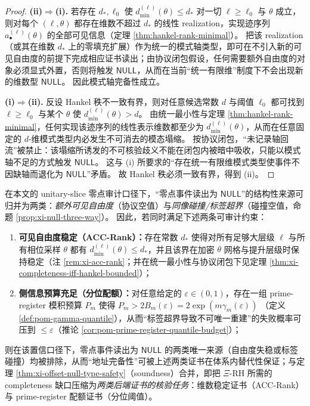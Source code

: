 \begin{proof}
\textbf{(ii)\(\Rightarrow\)(i).}
若存在 \(d_\ast,\ell_0\) 使 \(d^{(\ell)}_{\min}(\theta)\le d_\ast\) 对一切 \(\ell\ge\ell_0\) 与 \(\theta\) 成立，则对每个 \((\ell,\theta)\) 都存在维数不超过 \(d_\ast\) 的线性 realization，实现迹序列 \(a^{(\ell)}_\bullet(\theta)\) 的全部可见信息（定理 \ref{thm:hankel-rank-minimal}）。
把该 realization（或其在维数 \(d_\ast\) 上的零填充扩展）作为统一的模式轴类型，即可在不引入新的可见自由度的前提下完成相应证书读出；由协议闭包假设，任何需要额外自由度的对象必须显式外置，否则将触发 \(\mathsf{NULL}\)，从而在当前“统一有限维”制度下不会出现新的维数型 \(\mathsf{NULL}\)。
因此模式轴完备性成立。
\par
\textbf{(i)\(\Rightarrow\)(ii).}
反设 Hankel 秩不一致有界，则对任意候选常数 \(d\) 与阈值 \(\ell_0\) 都可找到 \(\ell\ge\ell_0\) 与某个 \(\theta\) 使
\(
d^{(\ell)}_{\min}(\theta)>\!d
\)。
由统一最小性与定理 \ref{thm:hankel-rank-minimal}，任何实现该迹序列的线性表示维数都至少为 \(d^{(\ell)}_{\min}(\theta)\)，从而在任意固定的 \(d\)-维模式类型内必发生不可消去的模态塌缩。
按协议闭包，“未记录轴回流”被禁止：该塌缩所诱发的不可核验歧义不能在闭包内被暗中吸收，只能以模式轴不足的方式触发 \(\mathsf{NULL}\)。
这与 (i) 所要求的“存在统一有限维模式类型使事件不因缺轴而退化为 \(\mathsf{NULL}\)”矛盾。
故 Hankel 秩必须一致有界，得到 (ii)。
\end{proof}

\begin{proposition}\label{prop:xi-completeness-auditable-decomposition}
在本文的 unitary-slice 零点审计口径下，“零点事件读出为 \(\mathsf{NULL}\)”的结构性来源可归并为两类：\emph{额外可见自由度}（协议空值）与\emph{同像碰撞/标签超界}（碰撞空值，命题 \ref{prop:xi-null-three-way}）。
因此，若同时满足下述两条可审计约束：
\begin{enumerate}
  \item \textbf{可见自由度稳定（ACC-Rank）：}存在常数 \(d_\ast\) 使得对所有足够大层级 \(\ell\) 与所有相位采样 \(\theta\) 都有 \(d^{(\ell)}_{\min}(\theta)\le d_\ast\)，并且该界在加密 \(\theta\) 网格与提升层级时保持稳定（注 \ref{rem:xi-acc-rank}；并在统一最小性与协议闭包下见定理 \ref{thm:xi-completeness-iff-hankel-bounded}）；
  \item \textbf{侧信息预算充足（分位配额）：}对任意给定的 \(\varepsilon\in(0,1)\)，存在一组 prime-register 模积预算 \(P_m\) 使得
  \(
  P_m>2B_m(\varepsilon)=2\exp(m\gamma_m(\varepsilon))
  \)
  （定义 \ref{def:pom-gamma-quantile}），从而“标签超界导致不可唯一重建”的失败概率可压到 \(\le\varepsilon\)（推论 \ref{cor:pom-prime-register-quantile-budget}）；
\end{enumerate}
则在该置信口径下，零点事件读出为 \(\mathsf{NULL}\) 的两类唯一来源（自由度失稳或标签碰撞）均被排除，从而“地址完备性”可被上述两类证书在体系内替代性保证；与定理 \ref{thm:xi-offset-null-type-safety}（soundness）合并，即把 \(\Xi\)-RH 所需的 completeness 缺口压缩为\emph{两类后端证书的核验任务}：维数稳定证书（ACC-Rank）与 prime-register 配额证书（分位阈值）。
\end{proposition}

